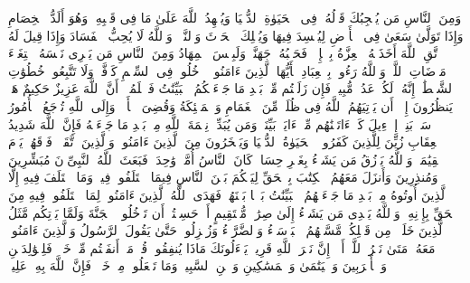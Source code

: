 وَمِنَ ٱلنَّاسِ مَن یُعۡجِبُكَ قَوۡلُهُۥ فِی ٱلۡحَیَوٰةِ ٱلدُّنۡیَا وَیُشۡهِدُ ٱللَّهَ عَلَىٰ مَا فِی قَلۡبِهِۦ وَهُوَ أَلَدُّ ٱلۡخِصَامِ%
\stopbuffer%
\startbuffer[\q:2:205]
وَإِذَا تَوَلَّىٰ سَعَىٰ فِی ٱلۡأَرۡضِ لِیُفۡسِدَ فِیهَا وَیُهۡلِكَ ٱلۡحَرۡثَ وَٱلنَّسۡلَۗ وَٱللَّهُ لَا یُحِبُّ ٱلۡفَسَادَ%
\stopbuffer%
\startbuffer[\q:2:206]
وَإِذَا قِیلَ لَهُ ٱتَّقِ ٱللَّهَ أَخَذَتۡهُ ٱلۡعِزَّةُ بِٱلۡإِثۡمِۚ فَحَسۡبُهُۥ جَهَنَّمُۖ وَلَبِئۡسَ ٱلۡمِهَادُ%
\stopbuffer%
\startbuffer[\q:2:207]
وَمِنَ ٱلنَّاسِ مَن یَشۡرِی نَفۡسَهُ ٱبۡتِغَاۤءَ مَرۡضَاتِ ٱللَّهِۗ وَٱللَّهُ رَءُوفُۢ بِٱلۡعِبَادِ%
\stopbuffer%
\startbuffer[\q:2:208]
یَٰۤأَیُّهَا ٱلَّذِینَ ءَامَنُوا۟ ٱدۡخُلُوا۟ فِی ٱلسِّلۡمِ كَاۤفَّةࣰ وَلَا تَتَّبِعُوا۟ خُطُوَٰتِ ٱلشَّیۡطَٰنِۚ إِنَّهُۥ لَكُمۡ عَدُوࣱّ مُّبِینࣱ%
\stopbuffer%
\startbuffer[\q:2:209]
فَإِن زَلَلۡتُم مِّنۢ بَعۡدِ مَا جَاۤءَتۡكُمُ ٱلۡبَیِّنَٰتُ فَٱعۡلَمُوۤا۟ أَنَّ ٱللَّهَ عَزِیزٌ حَكِیمٌ%
\stopbuffer%
\startbuffer[\q:2:210]
هَلۡ یَنظُرُونَ إِلَّاۤ أَن یَأۡتِیَهُمُ ٱللَّهُ فِی ظُلَلࣲ مِّنَ ٱلۡغَمَامِ وَٱلۡمَلَٰۤئِكَةُ وَقُضِیَ ٱلۡأَمۡرُۚ وَإِلَى ٱللَّهِ تُرۡجَعُ ٱلۡأُمُورُ%
\stopbuffer%
\startbuffer[\q:2:211]
سَلۡ بَنِیۤ إِسۡرَٰۤءِیلَ كَمۡ ءَاتَیۡنَٰهُم مِّنۡ ءَایَةِۭ بَیِّنَةࣲۗ وَمَن یُبَدِّلۡ نِعۡمَةَ ٱللَّهِ مِنۢ بَعۡدِ مَا جَاۤءَتۡهُ فَإِنَّ ٱللَّهَ شَدِیدُ ٱلۡعِقَابِ%
\stopbuffer%
\startbuffer[\q:2:212]
زُیِّنَ لِلَّذِینَ كَفَرُوا۟ ٱلۡحَیَوٰةُ ٱلدُّنۡیَا وَیَسۡخَرُونَ مِنَ ٱلَّذِینَ ءَامَنُوا۟ۘ وَٱلَّذِینَ ٱتَّقَوۡا۟ فَوۡقَهُمۡ یَوۡمَ ٱلۡقِیَٰمَةِۗ وَٱللَّهُ یَرۡزُقُ مَن یَشَاۤءُ بِغَیۡرِ حِسَابࣲ%
\stopbuffer%
\startbuffer[\q:2:213]
كَانَ ٱلنَّاسُ أُمَّةࣰ وَٰحِدَةࣰ فَبَعَثَ ٱللَّهُ ٱلنَّبِیِّۦنَ مُبَشِّرِینَ وَمُنذِرِینَ وَأَنزَلَ مَعَهُمُ ٱلۡكِتَٰبَ بِٱلۡحَقِّ لِیَحۡكُمَ بَیۡنَ ٱلنَّاسِ فِیمَا ٱخۡتَلَفُوا۟ فِیهِۚ وَمَا ٱخۡتَلَفَ فِیهِ إِلَّا ٱلَّذِینَ أُوتُوهُ مِنۢ بَعۡدِ مَا جَاۤءَتۡهُمُ ٱلۡبَیِّنَٰتُ بَغۡیَۢا بَیۡنَهُمۡۖ فَهَدَى ٱللَّهُ ٱلَّذِینَ ءَامَنُوا۟ لِمَا ٱخۡتَلَفُوا۟ فِیهِ مِنَ ٱلۡحَقِّ بِإِذۡنِهِۦۗ وَٱللَّهُ یَهۡدِی مَن یَشَاۤءُ إِلَىٰ صِرَٰطࣲ مُّسۡتَقِیمٍ%
\stopbuffer%
\startbuffer[\q:2:214]
أَمۡ حَسِبۡتُمۡ أَن تَدۡخُلُوا۟ ٱلۡجَنَّةَ وَلَمَّا یَأۡتِكُم مَّثَلُ ٱلَّذِینَ خَلَوۡا۟ مِن قَبۡلِكُمۖ مَّسَّتۡهُمُ ٱلۡبَأۡسَاۤءُ وَٱلضَّرَّاۤءُ وَزُلۡزِلُوا۟ حَتَّىٰ یَقُولَ ٱلرَّسُولُ وَٱلَّذِینَ ءَامَنُوا۟ مَعَهُۥ مَتَىٰ نَصۡرُ ٱللَّهِۗ أَلَاۤ إِنَّ نَصۡرَ ٱللَّهِ قَرِیبࣱ%
\stopbuffer%
\startbuffer[\q:2:215]
یَسۡءَلُونَكَ مَاذَا یُنفِقُونَۖ قُلۡ مَاۤ أَنفَقۡتُم مِّنۡ خَیۡرࣲ فَلِلۡوَٰلِدَیۡنِ وَٱلۡأَقۡرَبِینَ وَٱلۡیَتَٰمَىٰ وَٱلۡمَسَٰكِینِ وَٱبۡنِ ٱلسَّبِیلِۗ وَمَا تَفۡعَلُوا۟ مِنۡ خَیۡرࣲ فَإِنَّ ٱللَّهَ بِهِۦ عَلِیمࣱ%
\stopbuffer%
\startbuffer[\q:2:216]
